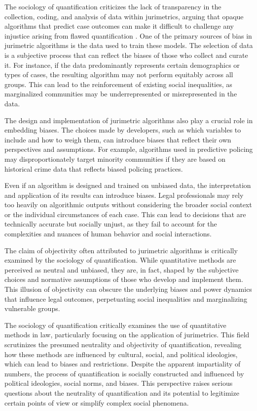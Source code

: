 The sociology of quantification criticizes the lack of transparency in the collection, coding, and analysis of data within jurimetrics, arguing that opaque algorithms that predict case outcomes can make it difficult to challenge any injustice arising from flawed quantification \cite{10.5040/9781350220645,10.1590/data.2022.65.3.267}. One of the primary sources of bias in jurimetric algorithms is the data used to train these models. The selection of data is a subjective process that can reflect the biases of those who collect and curate it. For instance, if the data predominantly represents certain demographics or types of cases, the resulting algorithm may not perform equitably across all groups. This can lead to the reinforcement of existing social inequalities, as marginalized communities may be underrepresented or misrepresented in the data.

The design and implementation of jurimetric algorithms also play a crucial role in embedding biases. The choices made by developers, such as which variables to include and how to weigh them, can introduce biases that reflect their own perspectives and assumptions. For example, algorithms used in predictive policing may disproportionately target minority communities if they are based on historical crime data that reflects biased policing practices.

Even if an algorithm is designed and trained on unbiased data, the interpretation and application of its results can introduce biases. Legal professionals may rely too heavily on algorithmic outputs without considering the broader social context or the individual circumstances of each case. This can lead to decisions that are technically accurate but socially unjust, as they fail to account for the complexities and nuances of human behavior and social interactions.

The claim of objectivity often attributed to jurimetric algorithms is critically examined by the sociology of quantification. While quantitative methods are perceived as neutral and unbiased, they are, in fact, shaped by the subjective choices and normative assumptions of those who develop and implement them. This illusion of objectivity can obscure the underlying biases and power dynamics that influence legal outcomes, perpetuating social inequalities and marginalizing vulnerable groups.

The sociology of quantification critically examines the use of quantitative methods in law, particularly focusing on the application of jurimetrics. This field scrutinizes the presumed neutrality and objectivity of quantification, revealing how these methods are influenced by cultural, social, and political ideologies, which can lead to biases and restrictions. Despite the apparent impartiality of numbers, the process of quantification is socially constructed and influenced by political ideologies, social norms, and biases. This perspective raises serious questions about the neutrality of quantification and its potential to legitimize certain points of view or simplify complex social phenomena.

